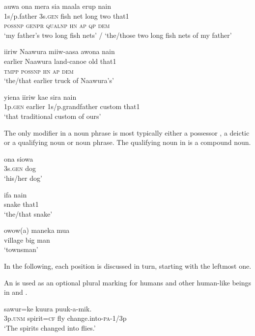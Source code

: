 \ea%
\label{ex:4:x392}
\glll auwa  ona  mera  sia  maala  erup  nain \\
1s/p.father  3s.\textsc{gen}  fish  net  long  two  that1\\
\textsc{possnp}  \textsc{genpr}  \textsc{qualnp}  \textsc{hn}  \textsc{ap}  \textsc{qp}  \textsc{dem} \\
\glt `my father's two long fish nets' / `the/those two long fish nets of my father'
\z

 

\ea%
\label{ex:4:x393}
\glll iiriw  Naawura  miiw-aasa  awona  nain \\
 earlier  Naawura  land-canoe  old  that1     \\
\textsc{tmpp}  \textsc{possnp}  \textsc{hn}  \textsc{ap}  \textsc{dem}\\
\glt`the/that earlier truck of Naawura's'
\z

\ea%
\label{ex:4:x394}
\gll yiena  iiriw  kae  sira  nain \\
   1p.\textsc{gen}  earlier  1s/p.grandfather  custom  that1   \\
\glt`that traditional custom of ours'
\z

The only modifier in a noun phrase is most typically either a possessor , a deictic  or a qualifying noun or noun phrase. The qualifying noun in  is a compound noun.

\ea%
\label{ex:4:x395}
\gll ona  siowa \\
 3s.\textsc{gen}  dog     \\
\glt`his/her dog'

\z

\ea%
\label{ex:4:x396}
\gll ifa  nain \\
 snake  that1     \\
\glt`the/that snake'
\z

\ea%
\label{ex:4:x397}
\gll owow(a)  maneka  mua \\
 village  big  man     \\
\glt`townsman'
\z

In the following, each  position is discussed in turn, starting with the leftmost one.  

An  is used as an optional plural marking for humans and other human-like beings in  and . 

\ea%
\label{ex:4:x398}
\gll {}  sawur=ke  kuura  puuk-a-mik. \\
   3p.\textsc{unm}  spirit=\textsc{cf}  fly  change.into-\textsc{pa}-1/3p   \\
\glt`The spirits changed into flies.'
\z


